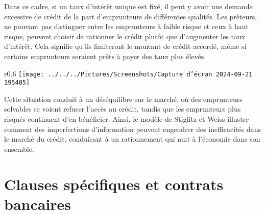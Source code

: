 \documentclass[a4paper, 12pt]{report}
\begin{document}
Dans ce cadre, si un taux d'intérêt unique est fixé, il peut y avoir une demande excessive de crédit de la part d'emprunteurs de différentes qualités. Les prêteurs, ne pouvant pas distinguer entre les emprunteurs à faible risque et ceux à haut risque, peuvent choisir de rationner le crédit plutôt que d'augmenter les taux d'intérêt. Cela signifie qu'ils limiteront le montant de crédit accordé, même si certains emprunteurs seraient prêts à payer des taux plus élevés.
\begin{wrapfigure}{r}{0.6\textwidth}
	\centering
	\texttt{[image: ../../../Pictures/Screenshots/Capture d'écran 2024-09-21 195405]}
\end{wrapfigure}
Cette situation conduit à un déséquilibre sur le marché, où des emprunteurs solvables se voient refuser l'accès au crédit, tandis que les emprunteurs plus risqués continuent d'en bénéficier. Ainsi, le modèle de Stiglitz et Weiss illustre comment des imperfections d'information peuvent engendrer des inefficacités dans le marché du crédit, conduisant à un rationnement qui nuit à l'économie dans son ensemble.








\section{Clauses spécifiques et contrats bancaires}
\end{document}
